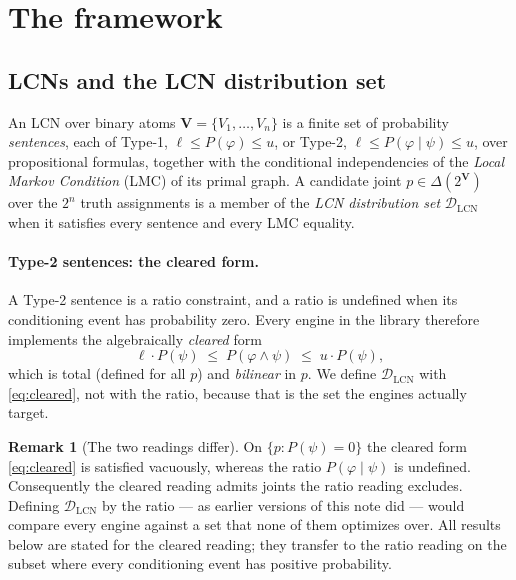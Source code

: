 \documentclass[11pt]{article}
\theoremstyle{definition}
\newtheorem{remark}{Remark}
\newcommand{\DLCN}{\mathcal{D}_{\mathrm{LCN}}}
\begin{document}
\tableofcontents

\section{The framework}\label{sec:framework}

\subsection{LCNs and the LCN distribution set}
An LCN over binary atoms $\mathbf V=\{V_1,\dots,V_n\}$ is a finite set of probability
\emph{sentences}, each of Type-1, $\ell\le P(\varphi)\le u$, or Type-2,
$\ell\le P(\varphi\mid\psi)\le u$, over propositional formulas, together with the conditional
independencies of the \emph{Local Markov Condition} (LMC) of its primal graph. A candidate joint
$p\in\Delta(2^{\mathbf V})$ over the $2^n$ truth assignments is a member of the \emph{LCN
distribution set} $\DLCN$ when it satisfies every sentence and every LMC equality.

\paragraph{Type-2 sentences: the cleared form.} A Type-2 sentence is a ratio constraint, and a ratio
is undefined when its conditioning event has probability zero. Every engine in the library therefore
implements the algebraically \emph{cleared} form
\begin{equation}\label{eq:cleared}
  \ell\cdot P(\psi)\;\le\;P(\varphi\wedge\psi)\;\le\;u\cdot P(\psi),
\end{equation}
which is total (defined for all $p$) and \emph{bilinear} in $p$. We define $\DLCN$ with
\eqref{eq:cleared}, not with the ratio, because that is the set the engines actually target.

\begin{remark}[The two readings differ]\label{rem:cleared}
On $\{p:P(\psi)=0\}$ the cleared form \eqref{eq:cleared} is satisfied vacuously, whereas the ratio
$P(\varphi\mid\psi)$ is undefined. Consequently the cleared reading admits joints the ratio reading
excludes. Defining $\DLCN$ by the ratio --- as earlier versions of this note did --- would compare
every engine against a set that none of them optimizes over. All results below are stated for the
cleared reading; they transfer to the ratio reading on the subset where every conditioning event has
positive probability.
\end{remark}
\end{document}
